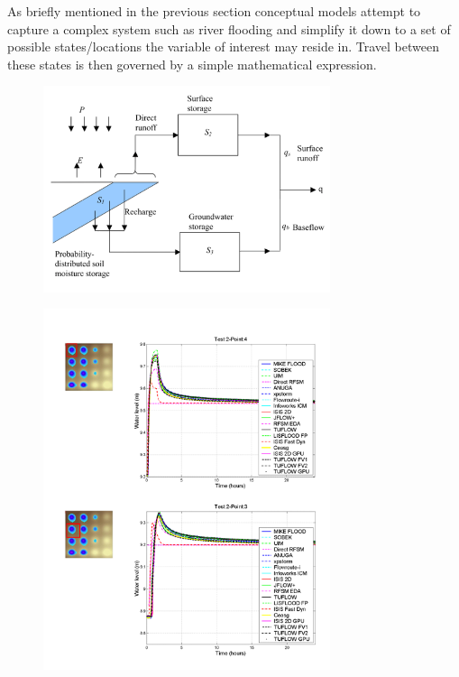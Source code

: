\documentclass[11pt]{article}
\begin{document}
 As briefly mentioned in the previous section conceptual models attempt to capture a complex system such as river flooding and simplify it down to a set of possible states/locations the variable of interest may reside in. Travel between these states is then governed by a simple mathematical expression.
 
 \begin{minipage}{0.5\textwidth}
    \begin{figure}[H]
        \centering
        \includegraphics[width=0.75\textwidth]{Figs/Concept.png}
        \label{fig:conceptual}
    \end{figure}
    \begin{figure}[H]
        \centering
        \includegraphics[width=0.75\textwidth]{Figs/EA_bench.png}
        \label{fig:eaBench}
    \end{figure}
\end{minipage}
\end{document}
